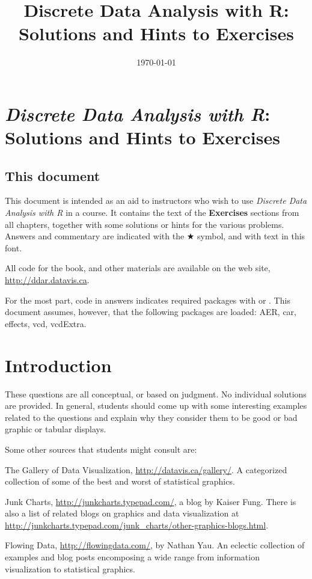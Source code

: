 \documentclass[10pt]{report}\usepackage[]{graphicx}\usepackage[]{color}
\title{\sffamily Discrete Data Analysis with R: \\ Solutions and Hints to Exercises}
\date{\today}
\begin{document}
\maketitle




\chapter*{\emph{Discrete Data Analysis with R}: \\ Solutions and Hints to Exercises}

{
\renewcommand{\baselinestretch}{.5}\normalsize
\sffamily\small
\tableofcontents
}

\vspace{3em}

\section*{This document}
This document is intended as an aid to instructors who wish to use
\emph{Discrete Data Analysis with R} in a course.  It contains the text
of the \textbf{Exercises} sections from all chapters, together with 
some solutions or hints for the various problems.  Answers and commentary are indicated
with the $\bigstar$ symbol, and \textsf{with text in this font}.

All \R code for the book, and other materials are available on the web site,
\url{http://ddar.datavis.ca}.

For the most part, \R code in answers indicates required packages with 
or .  This document assumes, however, that the following packages are
loaded:
\textsf{AER},
\textsf{car},
\textsf{effects},
\textsf{vcd},
\textsf{vcdExtra}.

\clearpage
\chapter{Introduction}\label{ch:intro}
\begin{ans}
These questions are all conceptual, or based on judgment.  No individual solutions are provided.
In general, students should come up with some interesting examples related to the questions
and explain why they consider them to be good or bad graphic or tabular displays.

Some other sources that students might consult are:
\begin{itemize*}
  \item The Gallery of Data Visualization, \url{http://datavis.ca/gallery/}. A categorized
  collection of some of the best and worst of statistical graphics.
  \item Junk Charts, \url{http://junkcharts.typepad.com/}, a blog by Kaiser Fung.  There
  is also a list of related blogs on graphics and data visualization at
  \url{http://junkcharts.typepad.com/junk_charts/other-graphics-blogs.html}.
  \item Flowing Data, \url{http://flowingdata.com/}, by Nathan Yau. An eclectic
  collection of examples and blog posts encomposing a wide range from information visualization
  to statistical graphics.
\end{itemize*}
\end{ans}
\end{document}
